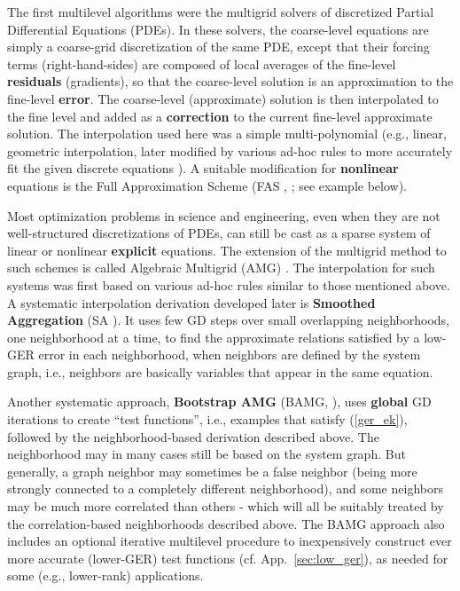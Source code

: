 \documentclass{article} %
\begin{document}
The first multilevel algorithms were the multigrid solvers of discretized Partial Differential Equations (PDEs). In these solvers, the coarse-level equations are simply a coarse-grid discretization of the same PDE, except that their forcing terms (right-hand-sides) are composed of local averages of the fine-level \textbf{residuals} (gradients), so that the coarse-level solution is an approximation to the fine-level \textbf{error}. The coarse-level (approximate) solution is then interpolated to the fine level and added as a \textbf{correction} to the current fine-level approximate solution. The interpolation used here was a simple multi-polynomial (e.g., linear, geometric interpolation, later modified by various ad-hoc rules to more accurately fit the given discrete equations \cite{mg_discontinous}). A suitable modification for \textbf{nonlinear} equations is the Full Approximation Scheme (FAS \cite{brandt77}, \cite[Sec.~8]{guide}; see example below).

Most optimization problems in science and engineering, even when they are not well-structured discretizations of PDEs, can still be cast as a sparse system of linear or nonlinear \textbf{explicit} equations. The extension of the multigrid method to such schemes is called Algebraic Multigrid (AMG) \cite{amg_book}. The interpolation for such systems was first based on various ad-hoc rules similar to those mentioned above. A systematic interpolation derivation developed later is \textbf{Smoothed Aggregation} (SA \cite{sa}). It uses few GD steps over small overlapping neighborhoods, one neighborhood at a time, to find the approximate relations satisfied by a low-GER error in each neighborhood, when neighbors are defined by the system graph, i.e., neighbors are basically variables that appear in the same equation.

Another systematic approach, \textbf{Bootstrap AMG} (BAMG, \cite[Sec.~17.2]{review2000}), uses \textbf{global} GD iterations to create ``test functions'', i.e., examples that satisfy (\ref{ger_ek}), followed by the neighborhood-based derivation described above. The neighborhood may in many cases still be based on the system graph. But generally, a graph neighbor may sometimes be a false neighbor (being more strongly connected to a completely different neighborhood), and some neighbors may be much more correlated than others - which will all be suitably treated by the correlation-based neighborhoods described above. The BAMG approach also includes an optional iterative multilevel procedure to inexpensively construct ever more accurate (lower-GER) test functions (cf. App.~\ref{sec:low_ger}), as needed for some (e.g., lower-rank) applications.
\end{document}
